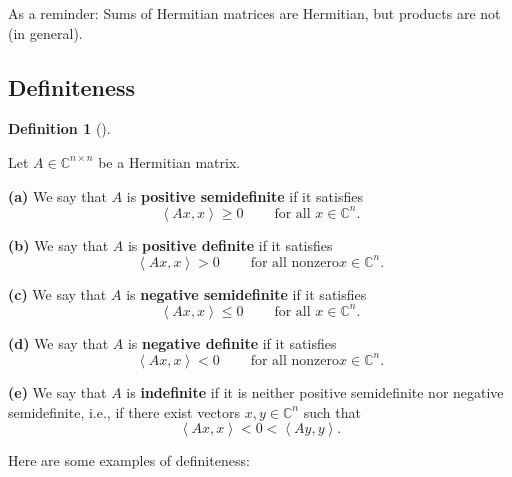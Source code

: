 \documentclass[numbers=enddot,12pt,final,onecolumn,notitlepage]{scrartcl}%
\numberwithin{exer}{subsection}
\theoremstyle{definition}
\newtheorem{defi}[theo]{Definition}
\newenvironment{definition}[1][]
{\begin{defi}[#1]\begin{leftbar}}
{\end{leftbar}\end{defi}}
\begin{document}
As a reminder: Sums of Hermitian matrices are Hermitian, but products are not
(in general).

\subsection{Definiteness}

\begin{definition}
Let $A\in\mathbb{C}^{n\times n}$ be a Hermitian matrix.

\textbf{(a)} We say that $A$ is \textbf{positive semidefinite} if it satisfies%
\[
\left\langle Ax,x\right\rangle \geq0\ \ \ \ \ \ \ \ \ \ \text{for all }%
x\in\mathbb{C}^{n}.
\]


\textbf{(b)} We say that $A$ is \textbf{positive definite} if it satisfies%
\[
\left\langle Ax,x\right\rangle >0\ \ \ \ \ \ \ \ \ \ \text{for all nonzero
}x\in\mathbb{C}^{n}.
\]


\textbf{(c)} We say that $A$ is \textbf{negative semidefinite} if it satisfies%
\[
\left\langle Ax,x\right\rangle \leq0\ \ \ \ \ \ \ \ \ \ \text{for all }%
x\in\mathbb{C}^{n}.
\]


\textbf{(d)} We say that $A$ is \textbf{negative definite} if it satisfies%
\[
\left\langle Ax,x\right\rangle <0\ \ \ \ \ \ \ \ \ \ \text{for all nonzero
}x\in\mathbb{C}^{n}.
\]


\textbf{(e)} We say that $A$ is \textbf{indefinite} if it is neither positive
semidefinite nor negative semidefinite, i.e., if there exist vectors
$x,y\in\mathbb{C}^{n}$ such that%
\[
\left\langle Ax,x\right\rangle <0<\left\langle Ay,y\right\rangle .
\]

\end{definition}

Here are some examples of definiteness:
\end{document}
